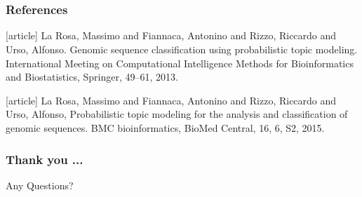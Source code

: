 \documentclass{beamer}
\begin{document}
\section{}
\begin{frame}
	\frametitle{References}
	\begin{thebibliography}{1}
		
		
			
			 La Rosa, Massimo and Fiannaca, Antonino and Rizzo, Riccardo and Urso, Alfonso. Genomic sequence classification using probabilistic topic modeling. International Meeting on Computational Intelligence Methods for Bioinformatics and Biostatistics, Springer, 49--61, 2013.
					
			 La Rosa, Massimo and Fiannaca, Antonino and Rizzo, Riccardo and Urso, Alfonso, Probabilistic topic modeling for the analysis and classification of genomic sequences. BMC bioinformatics, BioMed Central, 16, 6, S2, 2015.

	\end{thebibliography}
\end{frame}

\begin{frame}
	\frametitle{Thank you ...}
	\begin{center}
		\LARGE{Any Questions?}
	\end{center}
\end{frame}
\end{document}
